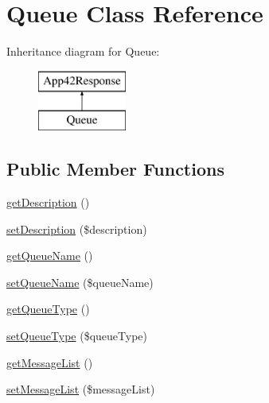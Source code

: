 \hypertarget{class_queue}{\section{Queue Class Reference}
\label{class_queue}
}
Inheritance diagram for Queue\+:\begin{figure}[H]
\begin{center}
\leavevmode
\includegraphics[height=2.000000cm]{class_queue}
\end{center}
\end{figure}
\subsection*{Public Member Functions}
\begin{DoxyCompactItemize}
\item 
\hyperlink{class_queue_a2e7bb35c71bf1824456ceb944cb7a845}{get\+Description} ()
\item 
\hyperlink{class_queue_a31fad3e39336ea079ea758e051866627}{set\+Description} (\$description)
\item 
\hyperlink{class_queue_adaef057ae931c9ba2b943a2f8b123ccb}{get\+Queue\+Name} ()
\item 
\hyperlink{class_queue_aa074bd13669eeb7c3e9510cad460c72a}{set\+Queue\+Name} (\$queue\+Name)
\item 
\hyperlink{class_queue_a62e03a24c2a1a14c3dbf6324c198e37b}{get\+Queue\+Type} ()
\item 
\hyperlink{class_queue_a0dde016b4f97659e1f403990c084a6e5}{set\+Queue\+Type} (\$queue\+Type)
\item 
\hyperlink{class_queue_a9977be76b67ba4e74a0e97e6c81d168e}{get\+Message\+List} ()
\item 
\hyperlink{class_queue_a61fc28b34a0b1f70c7a1b10cc6cf6ceb}{set\+Message\+List} (\$message\+List)
\end{DoxyCompactItemize}
